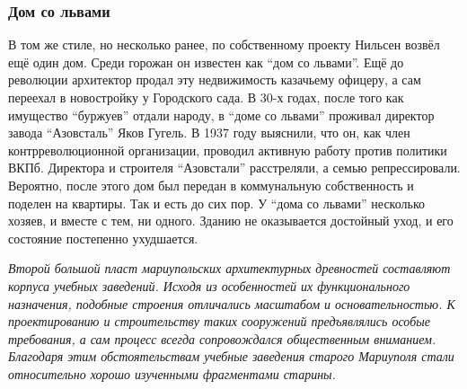  
 
 
 
 

\subsubsection{Дом со львами}

В том же стиле, но несколько ранее, по собственному проекту Нильсен возвёл ещё
один дом. Среди горожан он известен как \enquote{дом со львами}. Ещё до революции
архитектор продал эту недвижимость казачьему офицеру, а сам переехал в
новостройку у Городского сада. В 30-х годах, после того как имущество \enquote{буржуев}
отдали народу, в \enquote{доме со львами} проживал директор завода \enquote{Азовсталь} Яков
Гугель. В 1937 году выяснили, что он, как член контрреволюционной организации,
проводил активную работу против политики ВКПб. Директора и строителя
\enquote{Азовстали} расстреляли, а семью репрессировали. Вероятно, после этого дом был
передан в коммунальную собственность и поделен на квартиры. Так и есть до сих
пор. У \enquote{дома со львами} несколько хозяев, и вместе с тем, ни одного. Зданию не
оказывается достойный уход, и его состояние постепенно ухудшается.


\emph{Второй большой пласт мариупольских архитектурных древностей составляют корпуса
учебных заведений. Исходя из особенностей их функционального назначения,
подобные строения отличались масштабом и основательностью. К проектированию и
строительству таких сооружений предъявлялись особые требования, а сам процесс
всегда сопровождался общественным вниманием. Благодаря этим обстоятельствам
учебные заведения старого Мариуполя стали относительно хорошо изученными
фрагментами старины.}
